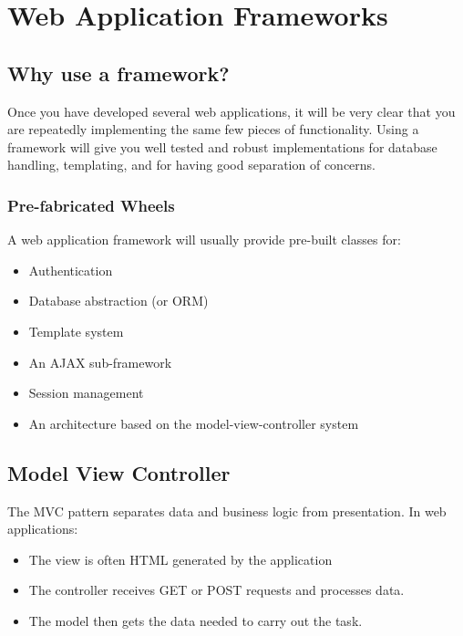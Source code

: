 \section{Web Application Frameworks}\label{sec:web_application_frameworks}

\subsection{Why use a framework?}\label{sub:why_use_a_framework_}

Once you have developed several web applications, it will be very clear that you are repeatedly implementing the same few pieces of functionality.
Using a framework will give you well tested and robust implementations for database handling, templating, and for having good separation of concerns.

\subsubsection{Pre-fabricated Wheels}\label{ssub:pre_fabricated_wheels}

A web application framework will usually provide pre-built classes for:
\begin{itemize}
	\item Authentication
	\item Database abstraction (or ORM)
	\item Template system
	\item An AJAX sub-framework
	\item Session management
	\item An architecture based on the model-view-controller system
\end{itemize}

\subsection{Model View Controller}\label{sub:model_view_controller}

The MVC pattern separates data and business logic from presentation.
In web applications:
\begin{itemize}
	\item The view is often HTML generated by the application
	\item The controller receives GET or POST requests and processes data.
	\item The model then gets the data needed to carry out the task.
\end{itemize}

